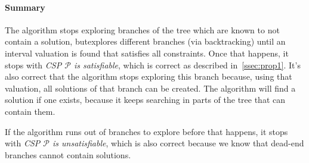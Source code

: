 \paragraph{Summary}
The algorithm stops exploring branches of the tree which are known to not contain a solution, butexplores different branches (via backtracking) until an interval valuation is found that satisfies all constraints.
Once that happens, it stops with \emph{CSP $\mathcal{P}$ is satisfiable}, which is correct as described in~\ref{ssec:prop1}.
It's also correct that the algorithm stops exploring this branch because, using that valuation, all solutions of that branch can be created.
The algorithm will find a solution if one exists, because it keeps searching in parts of the tree that can contain them.

If the algorithm runs out of branches to explore before that happens, it stops with \emph{CSP $\mathcal{P}$ is unsatisfiable}, which is also correct because we know that dead-end branches cannot contain solutions.

%




